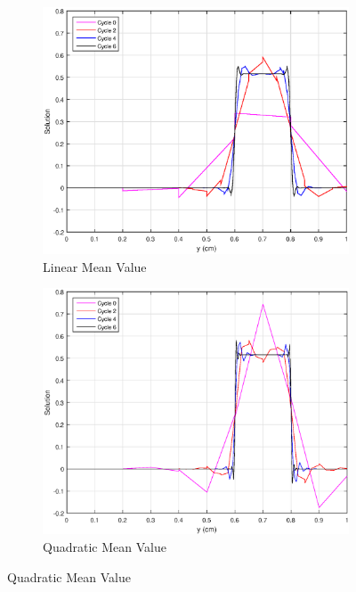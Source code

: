 \begin{figure}
{}
\vspace{2.5mm}
{
	\begin{subfigure}[b]{0.45\textwidth}
		\centering
		\label{subfig::SL_uniform_ef_mv1}
		\includegraphics[width=\textwidth]{figures/sec_BF/SL_MV_k1_uniform.eps}
		\caption{Linear Mean Value}
	\end{subfigure}
	\hfill
	\begin{subfigure}[b]{0.45\textwidth}
		\centering
		\label{subfig::SL_uniform_ef_mv2}
		\includegraphics[width=\textwidth]{figures/sec_BF/SL_MV_k2_uniform.eps}
		\caption{Quadratic Mean Value}
	\end{subfigure}
}
\end{figure}

